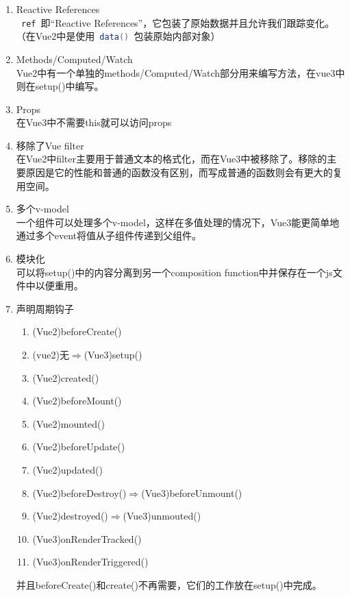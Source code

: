 \begin{enumerate}
\begin{enumerate}[label=\circled{\arabic*}]
          \item Reactive References\\
                \lstinline[language = Java]| ref |即“Reactive References”，它包装了原始数据并且允许我们跟踪变化。（在Vue2中是使用\lstinline[language = Java]| data() |包装原始内部对象）
          \item Methods/Computed/Watch\\
                Vue2中有一个单独的methods/Computed/Watch部分用来编写方法，在vue3中则在setup()中编写。
          \item Props\\
                在Vue3中不需要this就可以访问props
          \item 移除了Vue filter\\
                在Vue2中filter主要用于普通文本的格式化，而在Vue3中被移除了。移除的主要原因是它的性能和普通的函数没有区别，而写成普通的函数则会有更大的复用空间。
          \item 多个v-model\\
                一个组件可以处理多个v-model，这样在多值处理的情况下，Vue3能更简单地通过多个event将值从子组件传递到父组件。
          \item 模块化\\
                可以将setup()中的内容分离到另一个composition function中并保存在一个js文件中以便重用。
          \item 声明周期钩子
                \begin{enumerate}
                  \item (Vue2)beforeCreate()
                  \item (vue2)无$\Rightarrow$(Vue3)setup()
                  \item (Vue2)created()
                  \item (Vue2)beforeMount()
                  \item (Vue2)mounted()
                  \item (Vue2)beforeUpdate()
                  \item (Vue2)updated()
                  \item (Vue2)beforeDestroy()$\Rightarrow$(Vue3)beforeUnmount()
                  \item (Vue2)destroyed()$\Rightarrow$(Vue3)unmouted()
                  \item (Vue3)onRenderTracked()
                  \item (Vue3)onRenderTriggered()
                \end{enumerate}
                并且beforeCreate()和create()不再需要，它们的工作放在setup()中完成。
        \end{enumerate}
\end{enumerate}

